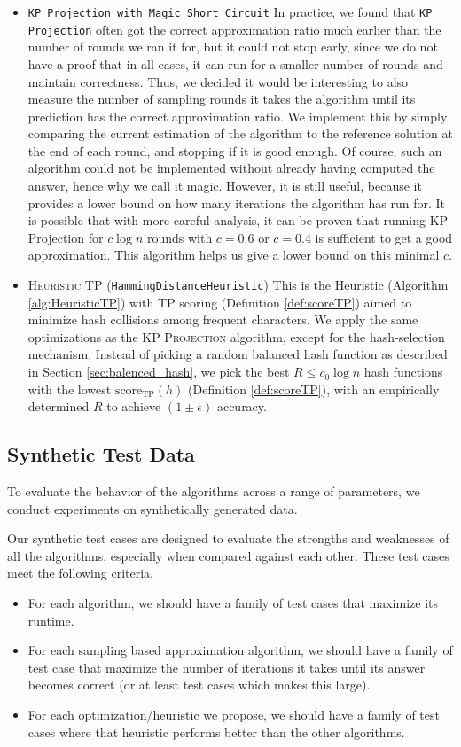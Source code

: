 \documentclass{article}
\theoremstyle{definition}
\newcommand{\eps}{\epsilon}
\newcommand{\score}{\text{score}}
\begin{document}
\begin{itemize}
    \item \texttt{KP Projection with Magic Short Circuit}
    In practice, we found that \texttt{KP Projection} often got the correct approximation ratio much earlier than the number of rounds we ran it for, but it could not stop early, since we do not have a proof that in all cases, it can run for a smaller number of rounds and maintain correctness.
    Thus, we decided it would be interesting to also measure the number of sampling rounds it takes the algorithm until its prediction has the correct approximation ratio.
    We implement this by simply comparing the current estimation of the algorithm to the reference solution at the end of each round, and stopping if it is good enough.
    Of course, such an algorithm could not be implemented without already having computed the answer, hence why we call it magic.
    However, it is still useful, because it provides a lower bound on how many iterations the algorithm has run for.
    It is possible that with more careful analysis, it can be proven that running KP Projection for $c \log n$ rounds with $c = 0.6$ or $c = 0.4$ is sufficient to get a good approximation.
    This algorithm helps us give a lower bound on this minimal $c$.

    \item \textsc{Heuristic TP} (\texttt{HammingDistanceHeuristic})
    This is the Heuristic (Algorithm \ref{alg:HeuristicTP}) with TP scoring (Definition \ref{def:scoreTP}) aimed to minimize hash collisions among frequent characters.
    We apply the same optimizations as the \textsc{KP Projection} algorithm, except for the hash-selection mechanism.
    Instead of picking a random balanced hash function as described in Section \ref{sec:balenced_hash}, we pick the best $R\le c_0\log n$ hash functions with the lowest $\score_\text{TP}(h)$ (Definition \ref{def:scoreTP}), with an empirically determined $R$ to achieve $(1\pm\eps)$ accuracy.
\end{itemize}

\subsection{Synthetic Test Data}
To evaluate the behavior of the algorithms across a range of parameters, we conduct experiments on synthetically generated data.

Our synthetic test cases are designed to evaluate the strengths and weaknesses of all the algorithms, especially when compared against each other.
These test cases meet the following criteria.
\begin{itemize}
    \item For each algorithm, we should have a family of test cases that maximize its runtime.
    \item For each sampling based approximation algorithm, we should have a family of test case that maximize the number of iterations it takes until its answer becomes correct (or at least test cases which makes this large).
    \item For each optimization/heuristic we propose, we should have a family of test cases where that heuristic performs better than the other algorithms.
\end{itemize}
\end{document}
